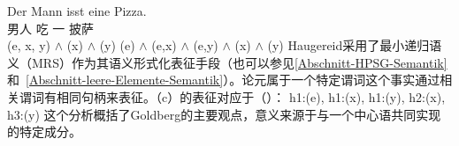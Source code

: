 \begin{exe}
\begin{xlist}[iv.]
\begin{exe}
\begin{xlist}[iv.]
\eal
\ex 
\gll Der Mann isst eine Pizza.\\
	  男人 吃 一 披萨\\
\ex {}(e, x, y) $\wedge$ (x) $\wedge$ (y)
\ex {}(e) $\wedge$ (e,x) $\wedge$ (e,y) $\wedge$ (x) $\wedge$ (y)
\zl
Haugereid采用了最小递归语义（MRS）\indexmrs 作为其语义形式化表征手段（也可以参见\ref{Abschnitt-HPSG-Semantik}和~\ref{Abschnitt-leere-Elemente-Semantik}）。论元属于一个特定谓词这个事实通过相关谓词有相同句柄来表征。（c）的表征对应于（）：
\ea
h1:(e), h1:(x), h1:(y), h2:(x), h3:(y)
\z
这个分析概括了Goldberg的主要观点，意义来源于与一个中心语共同实现的特定成分。


\end{xlist}
\end{exe}
\end{xlist}
\end{exe}
